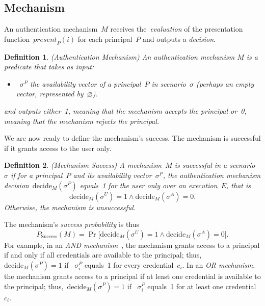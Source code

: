 \documentclass[conference,compsoc]{IEEEtran}
\newtheorem{definition}{Definition}
\begin{document}
\subsection{Mechanism}\label{sec:model_mechanism}
\noindent
An authentication mechanism~$M$ receives the~\emph{evaluation} of the presentation function~$\textit{present}_P(i)$ for each principal~$P$ and outputs a \emph{decision}.
\begin{definition} (Authentication Mechanism) An authentication mechanism $M$ is a predicate that takes as input:
\begin{itemize}
     \item~$\sigma^P$ the availability vector of a principal~$P$ in scenario~$\sigma$ (perhaps an empty vector, represented by~$\varnothing$).
\end{itemize}
and outputs either~1, meaning that the mechanism accepts the principal or~0, meaning that the mechanism rejects the principal.
\end{definition}

We are now ready to define the mechanism's success.
The mechanism is successful if it grants access to the user only. 
\begin{definition} (Mechanism Success) A mechanism~$M$ is \emph{successful} in a scenario~$\sigma$ if for a principal~$P$ and its availability vector~$\sigma^P$, the authentication mechanism decision~$\mathrm{decide}_M(\sigma^P)$ equals~1 for the user only over an execution~$E$, that is
\begin{equation*}
    \mathrm{decide}_M(\sigma^U)=1 \wedge \mathrm{decide}_M(\sigma^A)=0.
\end{equation*}
Otherwise, the mechanism is \emph{unsuccessful}.
\end{definition} 
The mechanism's \emph{success probability} is thus
\begin{equation*}
P_{\text{Success}}(M) =
\Pr\big[\mathrm{decide}_M(\sigma^U)=1 \wedge \mathrm{decide}_M(\sigma^A)=0\big].
\end{equation*}
For example, in an \emph{AND mechanism}~\cite{Eyal2021}, the mechanism grants access to a principal if and only if all credentials are available to the principal; thus,~$\mathrm{decide}_M(\sigma^P)=1$ if ~$\sigma^P_i$ equals~1 for every credential~$c_i$. In an \emph{OR mechanism}, the mechanism grants access to a principal if at least one credential is available to the principal; thus,~$\mathrm{decide}_M(\sigma^P)=1$ if ~$\sigma^P_i$ equals~1 for at least one credential~$c_i$.
\end{document}
